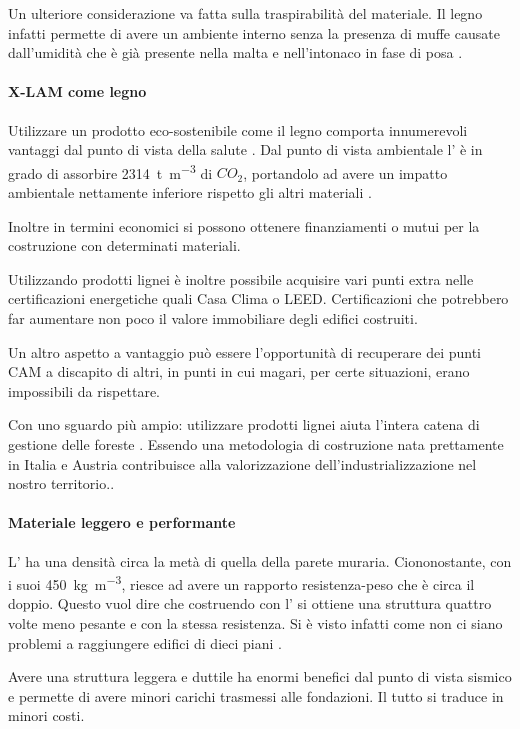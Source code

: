 Un ulteriore considerazione va fatta sulla traspirabilità del materiale. 
Il legno infatti permette di avere un ambiente interno senza la presenza di muffe causate dall'umidità che è già presente nella malta e nell'intonaco in fase di posa \cite{sutton_introduction_nodate}.
\paragraph{X-LAM come legno}
Utilizzare un prodotto eco-sostenibile come il legno comporta innumerevoli vantaggi dal punto di vista della salute \cite{EnergyCost}. Dal punto di vista ambientale l'\xlam{} è in grado di assorbire \SI{2314}{\tonne \per \cubic\metre} di $CO_2$, portandolo ad avere un impatto ambientale nettamente inferiore rispetto gli altri materiali \cite{hammond2011inventory}.

Inoltre in termini economici si possono ottenere finanziamenti o mutui per la costruzione con determinati materiali. 

Utilizzando prodotti lignei è inoltre possibile acquisire vari punti extra nelle certificazioni energetiche quali Casa Clima o LEED. 
Certificazioni che potrebbero far aumentare non poco il valore immobiliare degli edifici costruiti. 

Un altro aspetto a vantaggio può essere l'opportunità di recuperare dei punti CAM a discapito di altri, in punti in cui magari, per certe situazioni, erano impossibili da rispettare.

Con uno sguardo più ampio: utilizzare prodotti lignei aiuta l'intera catena di gestione delle foreste \cite{callegari2010production}. 
Essendo una metodologia di costruzione nata prettamente in Italia e Austria contribuisce alla valorizzazione dell'industrializzazione nel nostro territorio..
\paragraph{Materiale leggero e performante}
L'\xlam{} ha una densità circa la metà di quella della parete muraria. 
Ciononostante, con i suoi \SI{450}{\kilogram\per\cubic\metre}, riesce ad avere un rapporto resistenza-peso che è circa il doppio. 
Questo vuol dire che costruendo con l'\xlam{} si ottiene una struttura quattro volte meno pesante e con la stessa resistenza. 
Si è visto infatti come non ci siano problemi a raggiungere edifici di dieci piani \cite{10storey}.

Avere una struttura leggera e duttile ha enormi benefici dal punto di vista sismico e permette di avere minori carichi trasmessi alle fondazioni. 
Il tutto si traduce in minori costi.

